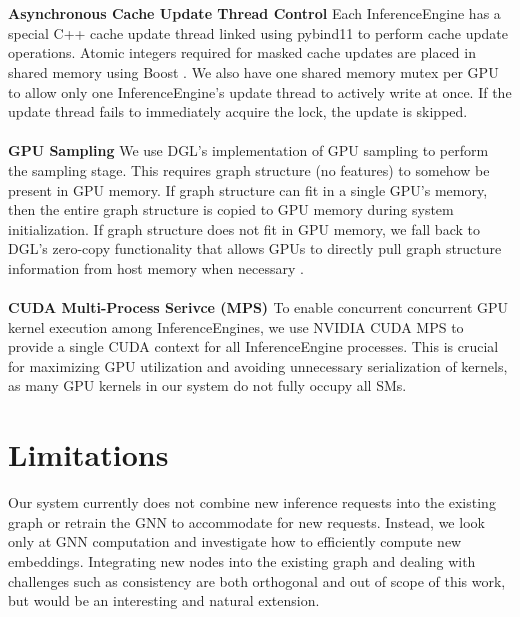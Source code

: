 \\ \\ 
\noindent \textbf{Asynchronous Cache Update Thread Control} \quad Each InferenceEngine has a special C++ cache update thread linked using pybind11 \cite{pybind11} to perform cache update operations. Atomic integers required for masked cache updates are placed in shared memory using Boost \cite{BoostLibrary}. We also have one shared memory mutex per GPU to allow only one InferenceEngine's update thread to actively write at once. If the update thread fails to immediately acquire the lock, the update is skipped.
\\ \\
\noindent \textbf{GPU Sampling} \quad We use DGL's implementation of GPU sampling to perform the sampling stage. This requires graph structure (no features) to somehow be present in GPU memory. If graph structure can fit in a single GPU's memory, then the entire graph structure is copied to GPU memory during system initialization. If graph structure does not fit in GPU memory, we fall back to DGL's zero-copy functionality that allows GPUs to directly pull graph structure information from host memory when necessary \cite{PyTorch_Direct_2021}. 
\\ \\
\noindent \textbf{CUDA Multi-Process Serivce (MPS) \cite{CUDA_MPS}} \quad
To enable concurrent concurrent GPU kernel execution among InferenceEngines, we use NVIDIA CUDA MPS to provide a single CUDA context for all InferenceEngine processes. This is crucial for maximizing GPU utilization and avoiding unnecessary serialization of kernels, as many GPU kernels in our system do not fully occupy all SMs.

\section{Limitations}
Our system currently does not combine new inference requests into the existing graph or retrain the GNN to accommodate for new requests. 
Instead, we look only at GNN computation and investigate how to efficiently compute new embeddings. 
Integrating new nodes into the existing graph and dealing with challenges such as consistency are both orthogonal and out of scope of this work, but would be an interesting and natural extension.

